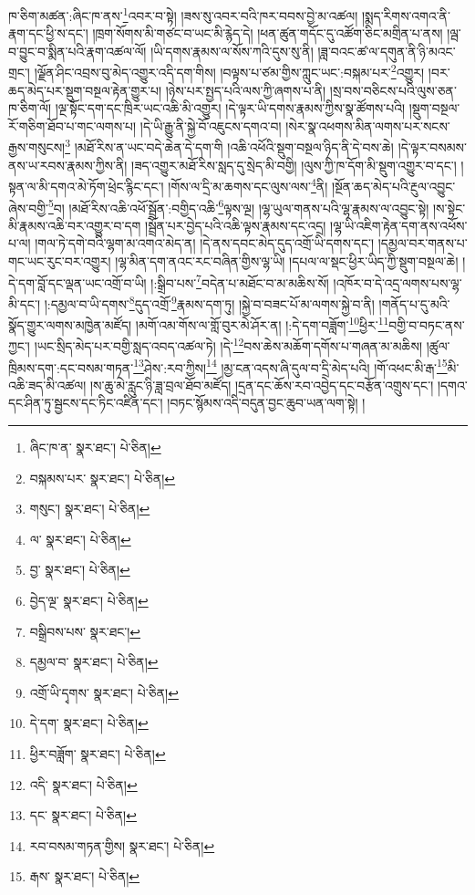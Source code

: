 ཁ་ཅིག་མཚན་:ཞིང་ཁ་ནས་\footnote{ཞིང་ཁ་ན་  སྣར་ཐང་།  པེ་ཅིན། }འབར་བ་སྟེ། །ཟས་སུ་འབར་བའི་ཁར་བབས་བྱེ་མ་འཚལ། །སྨད་རིགས་འགའ་ནི་རྣག་དང་ཕྱི་ས་དང་། །ཁྲག་སོགས་མི་གཙང་བ་ཡང་མི་རྙེད་དེ། །ཕན་ཚུན་གདོང་དུ་འཚོག་ཅིང་མགྲིན་པ་ནས། །ལྦ་བ་བྱུང་བ་སྨིན་པའི་རྣག་འཚལ་ལོ། །ཡི་དགས་རྣམས་ལ་སོས་ཀའི་དུས་སུ་ནི། །ཟླ་བའང་ཚ་ལ་དགུན་ནི་ཉི་མའང་གྲང་། །ལྗོན་ཤིང་འབྲས་བུ་མེད་འགྱུར་འདི་དག་གིས། །བལྟས་པ་ཙམ་གྱིས་ཀླུང་ཡང་:བསྐམ་པར་\footnote{བསྐམས་པར་  སྣར་ཐང་།  པེ་ཅིན། }འགྱུར། །བར་ཆད་མེད་པར་སྡུག་བསྔལ་རྟེན་གྱུར་པ། །ཉེས་པར་སྤྱད་པའི་ལས་ཀྱི་ཞགས་པ་ནི། །སྲ་བས་བཅིངས་པའི་ལུས་ཅན་ཁ་ཅིག་ལོ། །ལྔ་སྟོང་དག་དང་ཁྲིར་ཡང་འཆི་མི་འགྱུར། །དེ་ལྟར་ཡི་དགས་རྣམས་ཀྱིས་སྣ་ཚོགས་པའི། །སྡུག་བསྔལ་རོ་གཅིག་ཐོབ་པ་གང་ལགས་པ། །དེ་ཡི་རྒྱུ་ནི་སྐྱེ་བོ་འཇུངས་དགའ་བ། །སེར་སྣ་འཕགས་མིན་ལགས་པར་སངས་རྒྱས་གསུངས།\footnote{གསུང་།  སྣར་ཐང་།  པེ་ཅིན། } །མཐོ་རིས་ན་ཡང་བདེ་ཆེན་དེ་དག་གི །འཆི་འཕོའི་སྡུག་བསྔལ་ཉིད་ནི་དེ་བས་ཆེ། །དེ་ལྟར་བསམས་ནས་ཡ་རབས་རྣམས་ཀྱིས་ནི། །ཟད་འགྱུར་མཐོ་རིས་སླད་དུ་སྲེད་མི་བགྱི། །ལུས་ཀྱི་ཁ་དོག་མི་སྡུག་འགྱུར་བ་དང་། །སྟན་ལ་མི་དགའ་མེ་ཏོག་ཕྲེང་རྙིང་དང་། །གོས་ལ་དྲི་མ་ཆགས་དང་ལུས་ལས་\footnote{ལ་  སྣར་ཐང་།  པེ་ཅིན། }ནི། །སྔོན་ཆད་མེད་པའི་རྔུལ་འབྱུང་ཞེས་བགྱི་\footnote{བྱ་  སྣར་ཐང་།  པེ་ཅིན། }བ། །མཐོ་རིས་འཆི་འཕོ་སྦྲོན་:བགྱིད་འཆི་\footnote{བྱེད་ལྔ་  སྣར་ཐང་།  པེ་ཅིན། }ལྟས་ལྔ། །ལྷ་ཡུལ་གནས་པའི་ལྷ་རྣམས་ལ་འབྱུང་སྟེ། །ས་སྟེང་མི་རྣམས་འཆི་བར་འགྱུར་བ་དག །སྦྲོན་པར་བྱེད་པའི་འཆི་ལྟས་རྣམས་དང་འདྲ། །ལྷ་ཡི་འཇིག་རྟེན་དག་ནས་འཕོས་པ་ལ། །གལ་ཏེ་དགེ་བའི་ལྷག་མ་འགའ་མེད་ན། །དེ་ནས་དབང་མེད་དུད་འགྲོ་ཡི་དགས་དང་། །དམྱལ་བར་གནས་པ་གང་ཡང་རུང་བར་འགྱུར། །ལྷ་མིན་དག་ནའང་རང་བཞིན་གྱིས་ལྷ་ཡི། །དཔལ་ལ་སྡང་ཕྱིར་ཡིད་ཀྱི་སྡུག་བསྔལ་ཆེ། །དེ་དག་བློ་དང་ལྡན་ཡང་འགྲོ་བ་ཡི། །:སྒྲིབ་པས་\footnote{བསྒྲིབས་པས་  སྣར་ཐང་། }བདེན་པ་མཐོང་བ་མ་མཆིས་སོ། །འཁོར་བ་དེ་འདྲ་ལགས་པས་ལྷ་མི་དང་། །:དམྱལ་བ་ཡི་དགས་\footnote{དམྱལ་བ་  སྣར་ཐང་།  པེ་ཅིན། }དུད་འགྲོ་\footnote{འགྲོ་ཡི་དྭགས་  སྣར་ཐང་།  པེ་ཅིན། }རྣམས་དག་ཏུ། །སྐྱེ་བ་བཟང་པོ་མ་ལགས་སྐྱེ་བ་ནི། །གནོད་པ་དུ་མའི་སྣོད་གྱུར་ལགས་མཁྱེན་མཛོད། །མགོ་འམ་གོས་ལ་གློ་བུར་མེ་ཤོར་ན། །:དེ་དག་བཟློག་\footnote{དེ་དག་  སྣར་ཐང་།  པེ་ཅིན། }ཕྱིར་\footnote{ཕྱིར་བཟློག་  སྣར་ཐང་།  པེ་ཅིན། }བགྱི་བ་བཏང་ནས་ཀྱང་། །ཡང་སྲིད་མེད་པར་བགྱི་སླད་འབད་འཚལ་ཏེ། །དེ་\footnote{འདི་  སྣར་ཐང་།  པེ་ཅིན། }བས་ཆེས་མཆོག་དགོས་པ་གཞན་མ་མཆིས། །ཚུལ་ཁྲིམས་དག་:དང་བསམ་གཏན་\footnote{དང་  སྣར་ཐང་།  པེ་ཅིན། }ཤེས་:རབ་ཀྱིས།\footnote{རབ་བསམ་གཏན་གྱིས།  སྣར་ཐང་།  པེ་ཅིན། } །མྱ་ངན་འདས་ཞི་དུལ་བ་དྲི་མེད་པའི། །གོ་འཕང་མི་རྒ་\footnote{རྒས་  སྣར་ཐང་།  པེ་ཅིན། }མི་འཆི་ཟད་མི་འཚལ། །ས་ཆུ་མེ་རླུང་ཉི་ཟླ་བྲལ་ཐོབ་མཛོད། །དྲན་དང་ཆོས་རབ་འབྱེད་དང་བརྩོན་འགྲུས་དང་། །དགའ་དང་ཤིན་ཏུ་སྦྱངས་དང་ཏིང་འཛིན་དང་། །བཏང་སྙོམས་འདི་བདུན་བྱང་ཆུབ་ཡན་ལག་སྟེ། །
